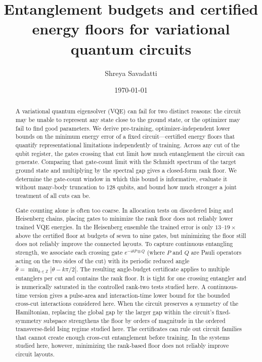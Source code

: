 \documentclass[reprint,aps,pra,floatfix,superscriptaddress,nofootinbib,longbibliography]{revtex4-2}
\theoremstyle{remark}
\theoremstyle{definition}
\begin{document}
\title{Entanglement budgets and certified energy floors for variational quantum
circuits}

\author{Shreya Savadatti}

\date{\today}

\begin{abstract}
A variational quantum eigensolver (VQE) can fail for two distinct reasons: the
circuit may be unable to represent any state close to the ground state, or the
optimizer may fail to find good parameters. We derive pre-training,
optimizer-independent lower bounds on the minimum energy error of a fixed
circuit---certified energy floors that quantify representational limitations
independently of training.
Across any cut of the qubit register, the gates crossing that cut limit how much
entanglement the circuit can generate. Comparing that gate-count limit with the
Schmidt spectrum of the target ground state and multiplying by the spectral gap
gives a closed-form rank floor. We determine the gate-count window in which this
bound is informative, evaluate it without many-body truncation to $128$ qubits,
and bound how much stronger a joint treatment of all cuts can be.

Gate counting alone is often too coarse. In allocation tests on disordered Ising
and Heisenberg chains, placing gates to minimize the rank floor does not reliably
lower trained VQE energies. In the Heisenberg ensemble the trained error is only
$13$--$19\times$ above the certified floor at budgets of seven to nine gates, but
minimizing the floor still does not reliably improve the connected layouts. To capture continuous entangling
strength, we associate each crossing gate $e^{-i\theta P\otimes Q}$ (where $P$ and
$Q$ are Pauli operators acting on the two sides of the cut) with its periodic
reduced angle $\tilde\theta=\min_{k\in\mathbb{Z}}|\theta-k\pi/2|$. The resulting
angle-budget certificate applies to multiple entanglers per cut and contains the
rank floor. It is tight for one crossing entangler and is numerically saturated
in the controlled rank-two tests studied here. A continuous-time version gives a
pulse-area and interaction-time lower bound for the bounded cross-cut
interactions considered here. When the circuit preserves a symmetry of the
Hamiltonian, replacing the global gap by the larger gap within the circuit's
fixed-symmetry subspace strengthens the floor by orders of magnitude in the
ordered transverse-field Ising regime studied here. The certificates can rule
out circuit families that cannot create enough cross-cut entanglement before
training. In the systems studied here, however, minimizing the
rank-based floor does not reliably improve circuit layouts.
\end{abstract}
\end{document}
